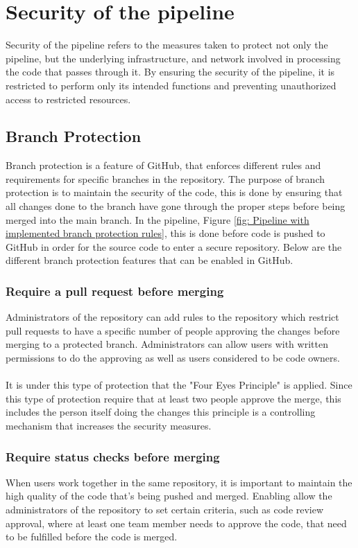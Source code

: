 \section{Security of the pipeline}
\label{Security of the pipeline}
Security of the pipeline refers to the measures taken to protect not only the pipeline, but the underlying infrastructure, and network involved in processing the code that passes through it. By ensuring the security of the pipeline, it is restricted to perform only its intended functions and preventing unauthorized access to restricted resources.  

\subsection{Branch Protection}
\label{branchprotection}
Branch protection is a feature of GitHub, that enforces different rules and requirements for specific branches in the repository. The purpose of branch protection is to maintain the security of the code, this is done by ensuring that all changes done to the branch have gone through the proper steps before being merged into the main branch. In the pipeline, Figure \ref{fig: Pipeline with implemented branch protection rules}, this is done before code is pushed to GitHub in order for the source code to enter a secure repository. Below are the different branch protection features that can be enabled in GitHub. \cite{ProtectedBranches}

\subsubsection{Require a pull request before merging}
Administrators of the repository can add rules to the repository which restrict pull requests to have a specific number of people approving the changes before merging to a protected branch. Administrators can allow users with written permissions to do the approving as well as users considered to be code owners. 
\\~\\
It is under this type of protection that the "Four Eyes Principle" is applied. Since this type of protection require that at least two people approve the merge, this includes the person itself doing the changes this principle is a controlling mechanism that increases the security measures. 

\subsubsection{Require status checks before merging}
When users work together in the same repository, it is important to maintain the high quality of the code that's being pushed and merged. Enabling  allow the administrators of the repository to set certain criteria, such as code review approval, where at least one team member needs to approve the code,  that need to be fulfilled before the code is merged. 

